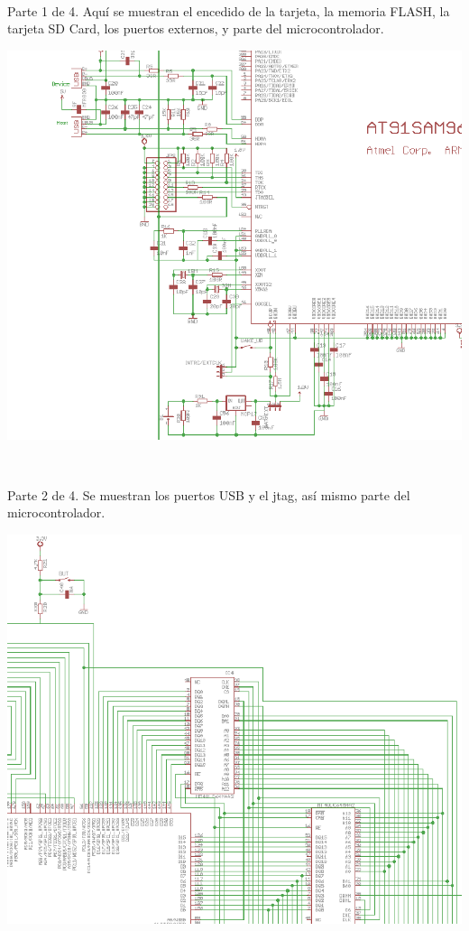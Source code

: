 \ 

Parte 1 de 4. Aquí se muestran el encedido de la tarjeta, la memoria
FLASH, la tarjeta SD Card, los puertos externos, y parte del microcontrolador.

\pagebreak{}

\includegraphics[scale=0.45]{appendix/samEsq2}

\ 

Parte 2 de 4. Se muestran los puertos USB y el jtag, así mismo parte
del microcontrolador.

\pagebreak{}

\includegraphics[scale=0.45]{appendix/samEsq3}

